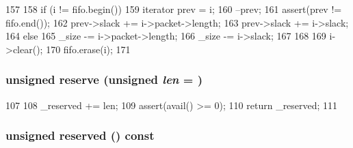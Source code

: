 \begin{DoxyCode}
157     {
158         if (i != fifo.begin()) {
159             iterator prev = i;
160             --prev;
161             assert(prev != fifo.end());
162             prev->slack += i->packet->length;
163             prev->slack += i->slack;
164         } else {
165             _size -= i->packet->length;
166             _size -= i->slack;
167         }
168 
169         i->clear();
170         fifo.erase(i);
171     }
\end{DoxyCode}
\hypertarget{classPacketFifo_a67916a8cd004cf1b079dd2aa310f3647}{
\subsubsection[{reserve}]{\setlength{\rightskip}{0pt plus 5cm}unsigned reserve (unsigned {\em len} = {})}}
\label{classPacketFifo_a67916a8cd004cf1b079dd2aa310f3647}



\begin{DoxyCode}
107     {
108         _reserved += len;
109         assert(avail() >= 0);
110         return _reserved;
111     }
\end{DoxyCode}
\hypertarget{classPacketFifo_ae64dcd86c20aa54fcacb3f25d7b66b9a}{
\subsubsection[{reserved}]{\setlength{\rightskip}{0pt plus 5cm}unsigned reserved () const}}
\label{classPacketFifo_ae64dcd86c20aa54fcacb3f25d7b66b9a}




